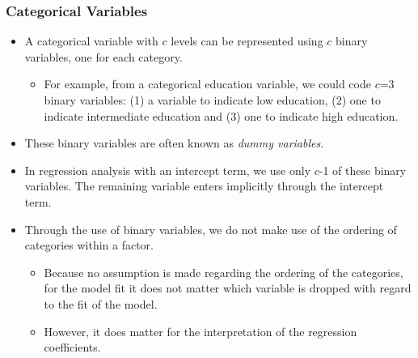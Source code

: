 \begin{frame}
 \frametitle{Categorical Variables}
 \begin{itemize}
 \item A categorical variable with
$c$ levels can be represented using $c$ binary variables, one for
each category.
\begin{itemize}
 \item For example, from a categorical education variable,
we could code $c$=3 binary variables: (1) a variable to indicate low
education, (2) one to indicate intermediate education and (3) one to
indicate high education.
\end{itemize}
 \item These binary variables are often known as
\emph{dummy variables}.
 \item In regression analysis with an intercept
term, we use only $c$-1 of these binary variables. The remaining
variable enters implicitly through the intercept term.

 \item Through the use of binary variables, we do not make use of the
ordering of categories within a factor.
\begin{itemize}
 \item Because no assumption is
made regarding the ordering of the categories, for the model fit it
does not matter which variable is dropped with regard to the fit of
the model.
 \item However, it does matter for the interpretation of the
regression coefficients.
\end{itemize}
 \end{itemize}
\end{frame}

